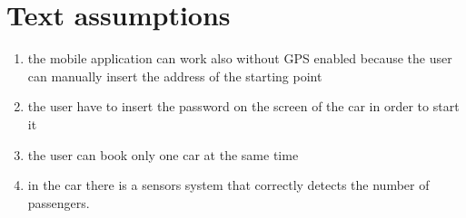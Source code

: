 \section{Text assumptions}
\begin{enumerate}
	\item the mobile application can work also without GPS enabled because the user can manually insert the address of the starting point
	\item the user have to insert the password on the screen of the car in order to start it
	\item the user can book only one car at the same time
	\item in the car there is a sensors system that correctly detects the number of passengers.
\end{enumerate}